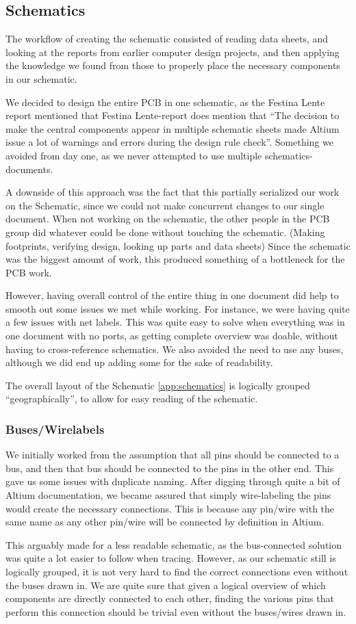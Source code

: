 \subsection {Schematics}
The workflow of creating the schematic consisted of reading data sheets,
and looking at the reports from earlier computer design projects, and then
applying the knowledge we found from those to properly place the necessary
components in our schematic.

We decided to design the entire \ac{PCB} in one schematic, as the Festina Lente
report mentioned that Festina Lente-report does mention that 
``The decision to make the central components appear in multiple schematic
sheets made Altium issue a lot of warnings and errors during the design rule 
check''\cite[p.~49]{berg2011festinalente}. Something we avoided from day one, 
as we never attempted to use multiple schematics-documents.

A downside of this approach was the fact that this partially serialized
our work on the Schematic, since we could not make concurrent changes to our
single document. When not working on the schematic, the other people in the
\ac{PCB} group did whatever could be done without touching the
schematic. (Making footprints, verifying design, looking up parts and data
sheets) Since the schematic was the biggest amount of work, this produced
something of a bottleneck for the PCB work.

However, having overall control of the entire thing in one document
did help to smooth out some issues we met while working. For instance,
we were having quite a few issues with net labels. This was quite easy to
solve when everything was in one document with no ports, as getting
complete overview was doable, without having to cross-reference schematics.
We also avoided the need to use any buses, although we did end up adding
some for the sake of readability.

The overall layout of the Schematic \ref{app:schematics} is logically grouped ``geographically'', to
allow for easy reading of the schematic.

\subsubsection {Buses/Wirelabels}
We initially worked from the assumption that all pins should be connected to a
bus, and then that bus should be connected to the pins in the other end. This
gave us some issues with duplicate naming. After digging through quite a bit of
Altium documentation, we became assured that simply wire-labeling the pins
would create the necessary connections. This is because any pin/wire with the
same name as any other pin/wire will be connected by definition in Altium.

This arguably made for a less readable schematic, as the bus-connected solution
was quite a lot easier to follow when tracing. However, as our schematic still
is logically grouped, it is not very hard to find the correct connections even
without the buses drawn in. We are quite sure that given a logical overview of
which components are directly connected to each other, finding the various pins
that perform this connection should be trivial even without the buses/wires
drawn in.
